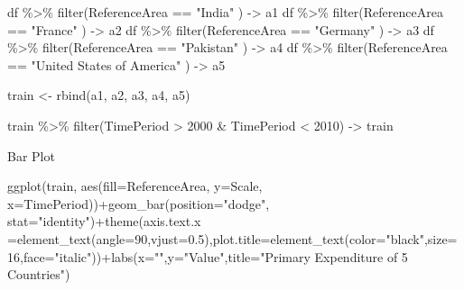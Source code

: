 \documentclass[
]{article}
\newenvironment{Shaded}{\begin{snugshade}}{\end{snugshade}}
\newcommand{\AttributeTok}[1]{\textcolor[rgb]{0.77,0.63,0.00}{#1}}
\newcommand{\DecValTok}[1]{\textcolor[rgb]{0.00,0.00,0.81}{#1}}
\newcommand{\FloatTok}[1]{\textcolor[rgb]{0.00,0.00,0.81}{#1}}
\newcommand{\FunctionTok}[1]{\textcolor[rgb]{0.00,0.00,0.00}{#1}}
\newcommand{\NormalTok}[1]{#1}
\newcommand{\OtherTok}[1]{\textcolor[rgb]{0.56,0.35,0.01}{#1}}
\newcommand{\SpecialCharTok}[1]{\textcolor[rgb]{0.00,0.00,0.00}{#1}}
\newcommand{\StringTok}[1]{\textcolor[rgb]{0.31,0.60,0.02}{#1}}
\begin{document}
\begin{Shaded}
\begin{Highlighting}[]
\NormalTok{df }\SpecialCharTok{\%\textgreater{}\%} \FunctionTok{filter}\NormalTok{(ReferenceArea }\SpecialCharTok{==} \StringTok{"India"}\NormalTok{ ) }\OtherTok{{-}\textgreater{}}\NormalTok{ a1}
\NormalTok{df }\SpecialCharTok{\%\textgreater{}\%} \FunctionTok{filter}\NormalTok{(ReferenceArea }\SpecialCharTok{==} \StringTok{"France"}\NormalTok{ ) }\OtherTok{{-}\textgreater{}}\NormalTok{ a2}
\NormalTok{df }\SpecialCharTok{\%\textgreater{}\%} \FunctionTok{filter}\NormalTok{(ReferenceArea }\SpecialCharTok{==} \StringTok{"Germany"}\NormalTok{ ) }\OtherTok{{-}\textgreater{}}\NormalTok{ a3}
\NormalTok{df }\SpecialCharTok{\%\textgreater{}\%} \FunctionTok{filter}\NormalTok{(ReferenceArea }\SpecialCharTok{==} \StringTok{"Pakistan"}\NormalTok{ ) }\OtherTok{{-}\textgreater{}}\NormalTok{ a4}
\NormalTok{df }\SpecialCharTok{\%\textgreater{}\%} \FunctionTok{filter}\NormalTok{(ReferenceArea }\SpecialCharTok{==} \StringTok{"United States of America"}\NormalTok{ ) }\OtherTok{{-}\textgreater{}}\NormalTok{ a5}

\NormalTok{train }\OtherTok{\textless{}{-}} \FunctionTok{rbind}\NormalTok{(a1, a2, a3, a4, a5)}

\NormalTok{train }\SpecialCharTok{\%\textgreater{}\%} \FunctionTok{filter}\NormalTok{(TimePeriod }\SpecialCharTok{\textgreater{}} \DecValTok{2000} \SpecialCharTok{\&}\NormalTok{ TimePeriod }\SpecialCharTok{\textless{}} \DecValTok{2010}\NormalTok{) }\OtherTok{{-}\textgreater{}}\NormalTok{ train}
\end{Highlighting}
\end{Shaded}

Bar Plot

\begin{Shaded}
\begin{Highlighting}[]
\FunctionTok{ggplot}\NormalTok{(train, }\FunctionTok{aes}\NormalTok{(}\AttributeTok{fill=}\NormalTok{ReferenceArea, }\AttributeTok{y=}\NormalTok{Scale, }\AttributeTok{x=}\NormalTok{TimePeriod))}\SpecialCharTok{+}\FunctionTok{geom\_bar}\NormalTok{(}\AttributeTok{position=}\StringTok{"dodge"}\NormalTok{, }\AttributeTok{stat=}\StringTok{"identity"}\NormalTok{)}\SpecialCharTok{+}\FunctionTok{theme}\NormalTok{(}\AttributeTok{axis.text.x =}\FunctionTok{element\_text}\NormalTok{(}\AttributeTok{angle=}\DecValTok{90}\NormalTok{,}\AttributeTok{vjust=}\FloatTok{0.5}\NormalTok{),}\AttributeTok{plot.title=}\FunctionTok{element\_text}\NormalTok{(}\AttributeTok{color=}\StringTok{"black"}\NormalTok{,}\AttributeTok{size=}\DecValTok{16}\NormalTok{,}\AttributeTok{face=}\StringTok{"italic"}\NormalTok{))}\SpecialCharTok{+}\FunctionTok{labs}\NormalTok{(}\AttributeTok{x=}\StringTok{""}\NormalTok{,}\AttributeTok{y=}\StringTok{"Value"}\NormalTok{,}\AttributeTok{title=}\StringTok{"Primary Expenditure of 5 Countries"}\NormalTok{)}
\end{Highlighting}
\end{Shaded}
\end{document}
